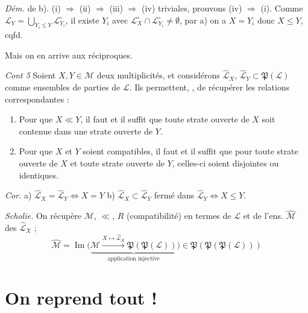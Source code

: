 \documentclass[11pt,a4paper]{article}
\begin{document}
\emph{Dém.} de b). \ill{} (i) $\Rightarrow$ (ii) $\Rightarrow$ (iii) $\Rightarrow$ (iv) triviales, prouvons (iv) $\Rightarrow$ (i). Comme $\mathcal{L}_Y = \bigcup_{Y_i \leq Y} \mathcal{L}^{\circ}_{Y_i}$, il existe $Y_i$ avec $\mathcal{L}^{\circ}_X \cap \mathcal{L}^{\circ}_{Y_i} \neq \emptyset$, par a) on a $X = Y_i$ donc $X \leq Y$, cqfd.

\marginal{\ill{}}
Mais on en arrive aux réciproques.

\emph{Cont 5} \quad Soient $X, Y \in \mathcal{M}$ deux multiplicités, et considérons \struck{\ill{}} $\widehat{\mathcal{L}}_X$, $\widehat{\mathcal{L}}_Y \subset \mathfrak{P}(\mathcal{L})$ comme ensembles de parties de $\mathcal{L}$. Ils permettent, , de récupérer les relations \ill{} correspondantes :
\begin{enumerate}
  \item[a)] Pour que $X \ll Y$, il faut et il suffit  que toute strate ouverte de $X$ soit contenue dans une strate ouverte de $Y$.
  \item[b)] Pour que $X$ et $Y$ soient compatibles, il faut et il suffit que pour toute strate ouverte de $X$ et toute strate ouverte de $Y$,  celles-ci soient disjointes ou identiques.
\end{enumerate}

\emph{Cor.} a) $\widehat{\mathcal{L}}_X = \widehat{\mathcal{L}}_Y \Leftrightarrow X = Y$ \quad b) $\widehat{\mathcal{L}}_X \subset \widehat{\mathcal{L}}_Y$ \struck{\ill{}} fermé dans $\widehat{\mathcal{L}}_Y \Leftrightarrow X \leq Y$.

\emph{Scholie.} On récupère $\mathcal{M}$, $\ll$, $R$ (compatibilité) \ill{} en termes de $\mathcal{L}$ et de l'ens. $\widehat{\mathcal{M}}$ des $\widehat{\mathcal{L}}_X$ ;
\[
  \widehat{\mathcal{M}} = \operatorname{Im}\bigl(\underbrace{\mathcal{M} \xrightarrow{X \mapsto \widehat{\mathcal{L}}_X} \mathfrak{P}(\mathfrak{P}(\mathcal{L}))}_{\text{application injective}}\bigr) \in \mathfrak{P}(\mathfrak{P}(\mathfrak{P}(\mathcal{L})))
\]

\section{On reprend tout !}
\end{document}
